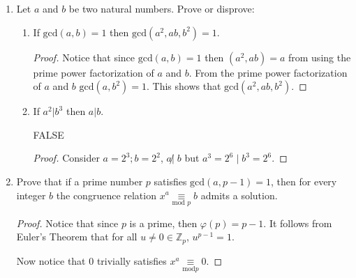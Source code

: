 \documentclass[12pt]{article}
\begin{document}
\begin{enumerate}
    \begin{proof}
    Since $\textrm{gcd}(a,b)=1$, there is a linear combination $\alpha \cdot a + \beta \cdot b =1$ such that $\alpha ,\beta \in \mathbb Z$. Therefore $\alpha \cdot a = 1 +(-\beta) \cdot b$. This is the definition of $\alpha \cdot a \underset{\textrm{mod }b}{\equiv} 1$. Let $c:= \alpha$.
    
    For $a = 55$ and $b = 42$, we apply the Euclidian algorithm to express 1 as a linear combination of $55$ and $42$. We get that $1 = 13 \cdot 55 - 17 \cdot 42$. Therefore $c:= 13$.
    \end{proof}
    \pagebreak
    
    \item  Let $a$ and $b$ be two natural numbers. Prove or disprove:
        \begin{enumerate}
            \item If $\textrm{gcd}(a,b) = 1$ then $\textrm{gcd}(a^2,ab,b^2) = 1$.
            \begin{proof}
                Notice that since $\textrm{gcd}(a,b)=1$ then $(a^2,ab) = a$ from using the prime power factorization of $a$ and $b$. From the prime power factorization of $a$ and $b$ $\textrm{gcd}(a,b^2) = 1$. This shows that $\textrm{gcd}(a^2, ab , b^2)$.
            \end{proof}
            
            \item If $a^2 | b^3$ then $a|b$.
            
            FALSE
            \begin{proof}
            Consider $a = 2^3; b = 2^2$, $a \not | \;b$ but $a^3 = 2^6 \; | \; b^3 = 2^6$.
            \end{proof}
            
        \end{enumerate}
        
    \item Prove that if a prime number $p$ satisfies $\textrm{gcd}(a,p-1)=1$, then for every integer $b$ the congruence relation $x^a \underset{\textrm{mod }p}{\equiv} b$ admits a solution.
    
    \begin{proof}
        Notice that since $p$ is a prime, then $\varphi(p) = p-1$. It follows from Euler's Theorem that for all $u \neq 0 \in \mathbb Z_p$, $u^{p-1} = 1$. 
        
        Now notice that $0$ trivially satisfies $x^a \underset{\textrm{mod} p}{\equiv} 0$.
        

\end{proof}
\end{enumerate}
\end{document}
